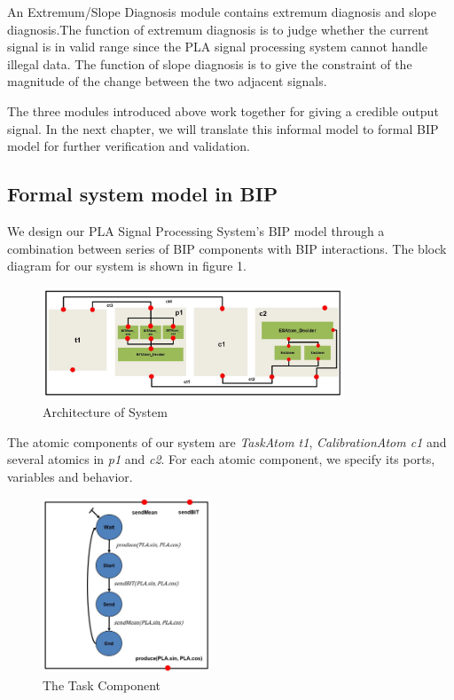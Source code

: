 An Extremum/Slope Diagnosis module contains extremum diagnosis and slope diagnosis.The function of extremum diagnosis is to judge whether the current signal is in valid range since the PLA signal processing system cannot handle illegal data. The function of slope diagnosis is to give the constraint of the magnitude of the change between the two adjacent signals.

The three modules introduced above work together for giving a credible output signal. In the next chapter, we will translate this informal model to formal BIP model for further verification and validation. 
\subsection{Formal system model in BIP}
We design our PLA Signal Processing System's BIP model through a combination between series of BIP components with BIP interactions. The block diagram for our system is shown in figure 1.

\begin{figure}[ht!]
	\centering
	\includegraphics[width=90mm]{figure/figure2.jpg}
	\caption{Architecture of System}
	\label{Sys_Model}
\end{figure}

The atomic components of our system are \emph{TaskAtom t1}, \emph{CalibrationAtom c1} and several atomics in \emph{p1} and \emph{c2}. For each atomic component, we specify its ports, variables and behavior.

\begin{figure}[ht!]
	\centering
	\includegraphics[width=50mm]{figure/figure3.jpg}
	\caption{The Task Component}
	\label{Task_Component}
\end{figure}

